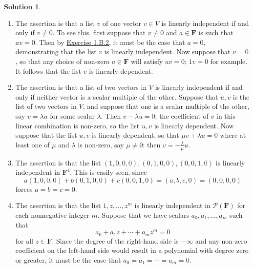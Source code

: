 \documentclass[12pt]{article}
\theoremstyle{definition}
\theoremstyle{exercise}
\theoremstyle{solution}
\newtheorem*{solution}{Solution}
\newcommand{\F}{\mathbf{F}}
\begin{document}
\begin{solution}
    \begin{enumerate}
        \item The assertion is that a list \( v \) of one vector \( v \in V \) is linearly independent if and only if \( v \neq 0 \). To see this, first suppose that \( v \neq 0 \) and \( a \in \F \) is such that \( av = 0 \). Then by \href{https://lew98.github.io/Mathematics/LADR_Section_1_B_Exercises.pdf}{Exercise 1.B.2}, it must be the case that \( a = 0 \), demonstrating that the list \( v \) is linearly independent. Now suppose that \( v = 0 \), so that any choice of non-zero \( a \in \F \) will satisfy \( av = 0 \); \( 1v = 0 \) for example. It follows that the list \( v \) is linearly dependent.

        \item The assertion is that a list of two vectors in \( V \) is linearly independent if and only if neither vector is a scalar multiple of the other. Suppose that \( u, v \) is the list of two vectors in \( V \), and suppose that one is a scalar multiple of the other, say \( v = \lambda u \) for some scalar \( \lambda \). Then \( v - \lambda u = 0 \); the coefficient of \( v \) in this linear combination is non-zero, so the list \( u, v \) is linearly dependent. Now suppose that the list \( u, v \) is linearly dependent, so that \( \mu v + \lambda u = 0 \) where at least one of \( \mu \) and \( \lambda \) is non-zero, say \( \mu \neq 0 \): then \( v = -\tfrac{\lambda}{\mu} u \).

        \item The assertion is that the list \( (1, 0, 0, 0), (0, 1, 0, 0), (0, 0, 1, 0) \) is linearly independent in \( \F^4 \). This is easily seen, since
        \[
            a(1, 0, 0, 0) + b(0, 1, 0, 0) + c(0, 0, 1, 0) = (a, b, c, 0) = (0, 0, 0, 0)
        \]
        forces \( a = b = c = 0 \).

        \item The assertion is that the list \( 1, z, \ldots, z^m \) is linearly independent in \( \mathcal{P}(\F) \) for each nonnegative integer \( m \). Suppose that we have scalars \( a_0, a_1, \ldots, a_m \) such that
        \[
            a_0 + a_1 z + \cdots + a_m z^m = 0
        \]
        for all \( z \in \F \). Since the degree of the right-hand side is \( -\infty \) and any non-zero coefficient on the left-hand side would result in a polynomial with degree zero or greater, it must be the case that \( a_0 = a_1 = \cdots = a_m = 0 \).
    \end{enumerate}
\end{solution}
\end{document}
